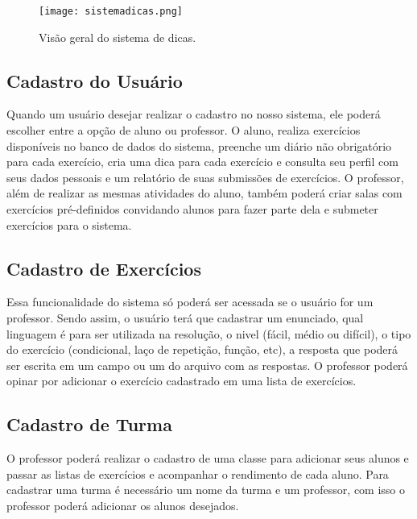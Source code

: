\begin{figure}[h]
	\captionsetup{justification=centering}
	\texttt{[image: sistemadicas.png]}
	\caption{Visão geral do sistema de dicas.}
	\label{figura:sistemadicas}
\end{figure}

\subsection{Cadastro do Usuário}

Quando um usuário desejar realizar o cadastro no nosso sistema, ele poderá escolher entre a opção de aluno ou professor. O aluno, realiza exercícios disponíveis no banco de dados do sistema, preenche um diário não obrigatório para cada exercício, cria uma dica para cada exercício e consulta seu perfil com seus dados pessoais e um relatório de suas submissões de exercícios. O professor, além de realizar as mesmas atividades do aluno, também poderá criar salas com exercícios pré-definidos convidando alunos para fazer parte dela e submeter exercícios para o sistema.

\subsection{Cadastro de Exercícios}

Essa funcionalidade do sistema só poderá ser acessada se o usuário for um professor. Sendo assim, o usuário terá que cadastrar um enunciado, qual linguagem é para ser utilizada na resolução, o nivel (fácil, médio ou difícil), o tipo do exercício (condicional, laço de repetição, função, etc), a resposta que poderá ser escrita em um campo ou um  do arquivo com as respostas. O professor poderá opinar por adicionar o exercício cadastrado em uma lista de exercícios. 


\subsection{Cadastro de Turma}

O professor poderá realizar o cadastro de uma classe para adicionar seus alunos e passar as listas de exercícios e acompanhar o rendimento de cada aluno. Para cadastrar uma turma é necessário um nome da turma e um professor, com isso o professor poderá adicionar os alunos desejados.


